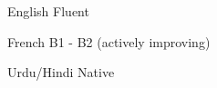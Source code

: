 

\begin{cvskills}

  \cvskill
    {English} %
    {Fluent} %

  \cvskill
    {French} %
    {B1 - B2 (actively improving)} %

  \cvskill
    {Urdu/Hindi} %
    {Native} %

\end{cvskills}
